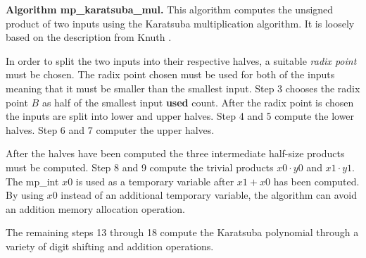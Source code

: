 \documentclass[b5paper]{book}
\begin{document}
\textbf{Algorithm mp\_karatsuba\_mul.}
This algorithm computes the unsigned product of two inputs using the Karatsuba multiplication algorithm.  It is loosely based on the description
from Knuth \cite[pp. 294-295]{TAOCPV2}.  

In order to split the two inputs into their respective halves, a suitable \textit{radix point} must be chosen.  The radix point chosen must
be used for both of the inputs meaning that it must be smaller than the smallest input.  Step 3 chooses the radix point $B$ as half of the 
smallest input \textbf{used} count.  After the radix point is chosen the inputs are split into lower and upper halves.  Step 4 and 5 
compute the lower halves.  Step 6 and 7 computer the upper halves.  

After the halves have been computed the three intermediate half-size products must be computed.  Step 8 and 9 compute the trivial products
$x0 \cdot y0$ and $x1 \cdot y1$.  The mp\_int $x0$ is used as a temporary variable after $x1 + x0$ has been computed.  By using $x0$ instead
of an additional temporary variable, the algorithm can avoid an addition memory allocation operation.

The remaining steps 13 through 18 compute the Karatsuba polynomial through a variety of digit shifting and addition operations.
\end{document}

